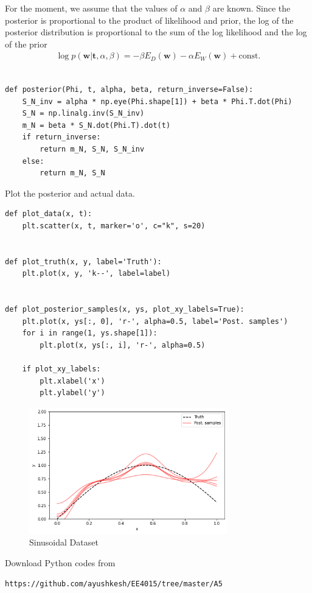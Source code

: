 \documentclass[journal,12pt,twocolumn]{IEEEtran}
\begin{document}
For the moment, we assume that the values of $\alpha$ and $\beta$ are known. Since the posterior is proportional to the product of likelihood and prior, the log of the posterior distribution is proportional to the sum of the log likelihood and the log of the prior
\begin{align}
    \log p(\mathbf{w} \lvert \mathbf{t}, \alpha, \beta) = 
-\beta E_D(\mathbf{w}) - \alpha E_W(\mathbf{w}) + \mathrm{const.} \label{eq:6}
\end{align}
\begin{lstlisting}

def posterior(Phi, t, alpha, beta, return_inverse=False):
    S_N_inv = alpha * np.eye(Phi.shape[1]) + beta * Phi.T.dot(Phi)
    S_N = np.linalg.inv(S_N_inv)
    m_N = beta * S_N.dot(Phi.T).dot(t)
    if return_inverse:
        return m_N, S_N, S_N_inv
    else:
        return m_N, S_N
\end{lstlisting}
Plot the posterior and actual data.
\begin{lstlisting}
def plot_data(x, t):
    plt.scatter(x, t, marker='o', c="k", s=20)


def plot_truth(x, y, label='Truth'):
    plt.plot(x, y, 'k--', label=label)


def plot_posterior_samples(x, ys, plot_xy_labels=True):
    plt.plot(x, ys[:, 0], 'r-', alpha=0.5, label='Post. samples')
    for i in range(1, ys.shape[1]):
        plt.plot(x, ys[:, i], 'r-', alpha=0.5)

    if plot_xy_labels:
        plt.xlabel('x')
        plt.ylabel('y')

\end{lstlisting}
\begin{figure}[!h]
\begin{center}
\includegraphics[width=3.4in]{a2.png}
\end{center}
\caption{Sinusoidal Dataset}
\label{fig:1}
\end{figure}
Download Python codes from 
%
\begin{lstlisting}
https://github.com/ayushkesh/EE4015/tree/master/A5
\end{lstlisting}
\end{document}
